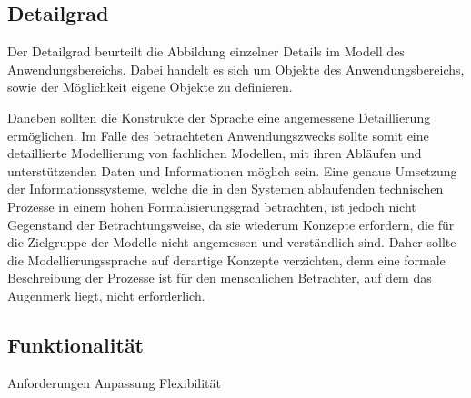 \subsection{Detailgrad}
\label{ssc:Detailgrad}
Der Detailgrad beurteilt die Abbildung einzelner Details im Modell des Anwendungsbereichs. Dabei handelt es sich um Objekte des Anwendungsbereichs, sowie der Möglichkeit eigene Objekte zu definieren.


Daneben sollten die
Konstrukte der Sprache eine angemessene Detaillierung ermöglichen. Im Falle des
betrachteten Anwendungszwecks sollte somit eine detaillierte Modellierung von
fachlichen Modellen, mit ihren Abläufen und unterstützenden Daten und Informationen
möglich sein. Eine genaue Umsetzung der Informationssysteme, welche die in den
Systemen ablaufenden technischen Prozesse in einem hohen Formalisierungsgrad
betrachten, ist jedoch nicht Gegenstand der Betrachtungsweise, da sie wiederum
Konzepte erfordern, die für die Zielgruppe der Modelle nicht angemessen und
verständlich sind. Daher sollte die Modellierungssprache auf derartige Konzepte
verzichten, denn eine formale Beschreibung der Prozesse ist für den menschlichen
Betrachter, auf dem das Augenmerk liegt, nicht erforderlich.

\subsection{Funktionalität}
\label{ssc:Funktionalität}
Anforderungen
Anpassung
Flexibilität

